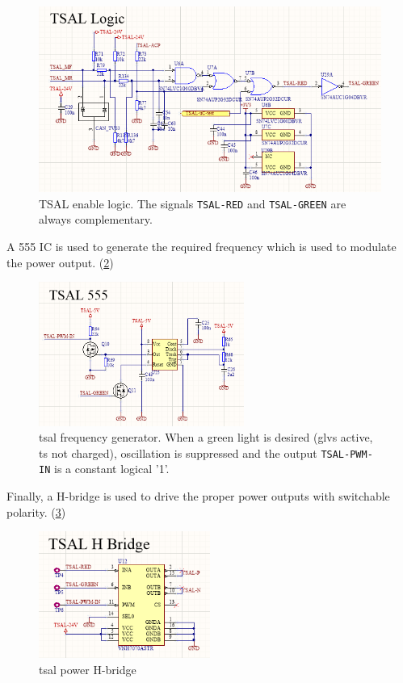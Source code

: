 \begin{figure}[H]
	\centering
	\includegraphics[width=\textwidth]{./img/TSAL-logic.png}
	\caption[TSAL enable logic]{TSAL enable logic. The signals \texttt{TSAL-RED} and \texttt{TSAL-GREEN} are always complementary.}
	\label{fig:TSAL-logic}
\end{figure}

A 555 IC is used to generate the required frequency which is used to modulate the power output. (\ref{fig:TSAL-555})

\begin{figure}[H]
	\centering
	\includegraphics[width=0.6\textwidth]{./img/TSAL-555.png}
	\caption[TSAL frequency generator]{\gls{tsal} frequency generator. When a green light is desired (\gls{glvs} active, \gls{ts} not charged), oscillation is suppressed and the output \texttt{TSAL-PWM-IN} is a constant logical '1'.}
	\label{fig:TSAL-555}
\end{figure}

Finally, a H-bridge is used to drive the proper power outputs with switchable polarity. (\ref{fig:TSAL-H-bridge})

\begin{figure}[H]
	\centering
	\includegraphics[width=0.5\textwidth]{./img/TSAL-H-bridge.png}
	\caption{\gls{tsal} power H-bridge}
	\label{fig:TSAL-H-bridge}
\end{figure}

